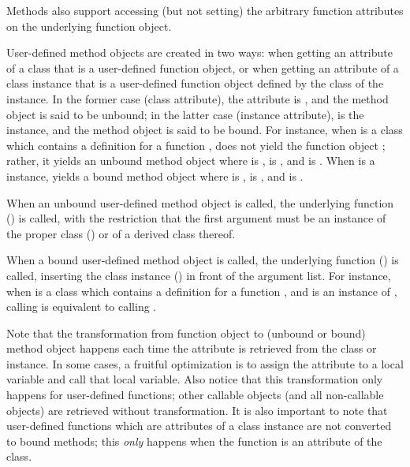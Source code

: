 \begin{description}
\begin{description}
Methods also support accessing (but not setting) the arbitrary
function attributes on the underlying function object.

User-defined method objects are created in two ways: when getting an
attribute of a class that is a user-defined function object, or when
getting an attribute of a class instance that is a user-defined
function object defined by the class of the instance.  In the former
case (class attribute), the  attribute is ,
and the method object is said to be unbound; in the latter case
(instance attribute),  is the instance, and the method
object is said to be bound.  For
instance, when  is a class which contains a definition for a
function ,  does not yield the function object
; rather, it yields an unbound method object  where
 is ,  is , and
 is .  When  is a 
instance,  yields a bound method object  where
 is ,  is , and
 is .

When an unbound user-defined method object is called, the underlying
function () is called, with the restriction that the
first argument must be an instance of the proper class
() or of a derived class thereof.

When a bound user-defined method object is called, the underlying
function () is called, inserting the class instance
() in front of the argument list.  For instance, when
 is a class which contains a definition for a function
, and  is an instance of , calling
 is equivalent to calling .

Note that the transformation from function object to (unbound or
bound) method object happens each time the attribute is retrieved from
the class or instance.  In some cases, a fruitful optimization is to
assign the attribute to a local variable and call that local variable.
Also notice that this transformation only happens for user-defined
functions; other callable objects (and all non-callable objects) are
retrieved without transformation.  It is also important to note that
user-defined functions which are attributes of a class instance are
not converted to bound methods; this \emph{only} happens when the
function is an attribute of the class.


\end{description}
\end{description}
